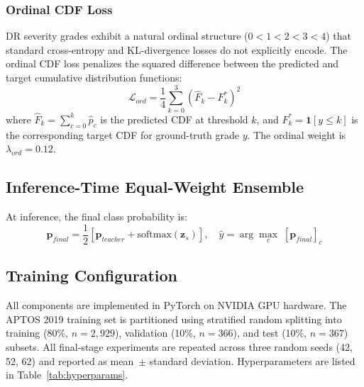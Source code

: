 \documentclass[a4paper,fleqn]{cas-dc}
\begin{document}
\subsubsection{Ordinal CDF Loss}
DR severity grades exhibit a natural ordinal structure ($0 < 1 < 2 < 3 < 4$) that standard cross-entropy and KL-divergence losses do not explicitly encode. The ordinal CDF loss penalizes the squared difference between the predicted and target cumulative distribution functions:
\begin{equation}
  \mathcal{L}_{ord} = \frac{1}{4}\sum_{k=0}^{3} \left(\hat{F}_k - F_k^*\right)^2
\end{equation}
where $\hat{F}_k = \sum_{c=0}^{k} \hat{p}_c$ is the predicted CDF at threshold $k$, and $F_k^* = \mathbf{1}[y \leq k]$ is the corresponding target CDF for ground-truth grade $y$. The ordinal weight is $\lambda_{ord} = 0.12$.

\subsection{Inference-Time Equal-Weight Ensemble}

At inference, the final class probability is:
\begin{equation}
  \mathbf{p}_{final} = \frac{1}{2}\!\left[\mathbf{p}_{teacher} +
  \text{softmax}(\mathbf{z}_s)\right], \quad
  \hat{y} = \arg\max_c\; [\mathbf{p}_{final}]_c
\end{equation}

\subsection{Training Configuration}

All components are implemented in PyTorch on NVIDIA GPU hardware. The APTOS 2019 training set is partitioned using stratified random splitting into training (80\%, $n{=}2{,}929$), validation (10\%, $n{=}366$), and test (10\%, $n{=}367$) subsets. All final-stage experiments are repeated across three random seeds (42, 52, 62) and reported as mean~$\pm$ standard deviation. Hyperparameters are listed in Table~\ref{tab:hyperparams}.
\end{document}
